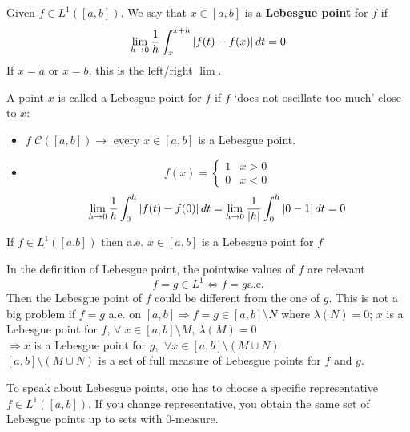 \begin{definition}
    Given \(f \in L^1([a,b])\). We say that \(x \in [a,b]\) is a \textbf{Lebesgue point} for \(f\) if 
    \[
        \lim_{h \to 0} \frac{1}{h} \int_x^{x+h} \abs{f(t) - f(x)} \, dt = 0
    \]
    If \(x=a\) or \(x=b\), this is the left/right \(\lim\).
\end{definition}
\begin{remark}
    A point \(x\) is called a Lebesgue point for \(f\) if \(f\) `does not oscillate too much' close to \(x\):
    \begin{itemize}
        \item \(f\) \(\mathcal{C}([a,b]) \to \text{ every } x \in [a,b]\) is a Lebesgue point.
        \item \[
            f(x) = \begin{cases}
                1  & x > 0 \\
            0 & x < 0
            \end{cases}
        \]
        \[
            \lim_{h \to 0} \frac{1}{h} \int_0^{h} \abs{f(t) - f(0)} \, dt = \lim_{h \to 0} \frac{1}{\abs{h}} \int_0^{h} \abs{0 - 1} \, dt = 0
        \]
    \end{itemize}
\end{remark}
\begin{theorem}[Lebesgue]
    If \(f \in L^1([a.b])\) then a.e. \(x \in [a,b]\) is a Lebesgue point for \(f\)
\end{theorem}
\begin{remark}
    In the definition of Lebesgue point, the pointwise values of \(f\) are relevant 
    \[
        f = g \in L^1 \Longleftrightarrow f = g \text{a.e.}
    \]
    Then the Lebesgue point of \(f\) could be different from the one of \(g\).  
    This is not a big problem if \(f = g\) a.e. on \([a,b] \Longrightarrow f = g \in [a,b]\setminus N\) where \(\lambda(N) = 0\); \(x\) is a Lebesgue point for \(f\), \(\forall \; x \in \left[a, b\right] \setminus M, \ \lambda(M)=0\) \\
    \(\Rightarrow x \) is a Lebesgue point for \(g\), \(\ \forall x \in \left[a, b\right] \setminus (M \cup N)\) \\
    \(\left[a, b\right] \setminus (M \cup N)\) is a set of full measure of Lebesgue points for \(f\) and \(g\).
\end{remark}
To speak about Lebesgue points, one has to choose a specific representative \(f \in L^1([a,b])\). If you change representative, you obtain the same set of Lebesgue points up to sets with \(0\)-measure.

